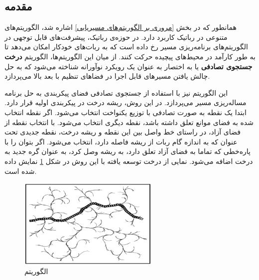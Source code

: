 \subsection{مقدمه}
همانطور که در بخش
\ref{مروری بر الگوریتم‌های مسیریابی}
اشاره شد، الگوریتم‌های متنوعی در رباتیک کاربرد دارد.
در حوزه‌ی رباتیک، پیشرفت‌های قابل توجهی در الگوریتم‌های برنامه‌ریزی مسیر رخ داده است که به ربات‌های خودکار امکان می‌دهد تا به طور کارآمد در محیط‌های پیچیده حرکت کنند. از میان این الگوریتم‌ها، الگوریتم 
\textbf{درخت جستجوی تصادفی}
\noindent\unskip{}
یا به اختصار
به عنوان یک رویکرد نوآورانه شناخته می‌شود که به حل چالش یافتن مسیرهای قابل اجرا در فضاهای تنظیم با بعد بالا می‌پردازد. 

این الگوریتم نیز با استفاده از جستجوی تصادفی فضای پیکربندی به حل برنامه مساله‌ریزی مسیر می‌پردازد. در این روش، ریشه درخت در پیکربندی اولیه قرار دارد. ابتدا یک نقطه به صورت تصادفی با توزیع یکنواخت
\noindent\unskip{}
انتخاب می‌شود. اگر نقطه انتخاب شده به فضای موانع تعلق داشته باشد، نقطه دیگری انتخاب می‌شود. با انتخاب نقطه از فضای آزاد، در راستای خط واصل بین این نقطه و ریشه درخت، نقطه جدیدی تحت عنوان
که به اندازه گام ربات از ریشه فاصله دارد، انتخاب می‌شود.
اگر بتوان
را با پاره‌خطی که تماما به فضای آزاد تعلق دارد، به ریشه وصل کرد،
به عنوان گره جدید به درخت اضافه می‌شود.
نمایی از درخت توسعه یافته با این روش در شکل
\ref{RRT}
نمایش داده شده است.
\begin{figure}[H]
	\centering
	\includegraphics[width=0.6\textwidth]{./images/Chapter2/RRT}	
	\caption[الگوریتم ]{الگوریتم  \cite{MohadesKhorasani}}
	\label{RRT}
\end{figure}
\noindent
\unskip


